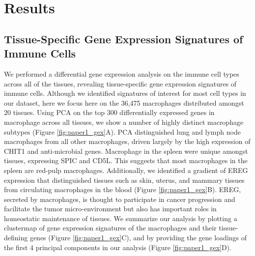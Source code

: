 \section{Results}

\subsection{Tissue-Specific Gene Expression Signatures of Immune Cells}

We performed a differential gene expression analysis on the immune cell types across all of the tissues, revealing tissue-specific gene expression signatures of immune cells. Although we identified signatures of interest for most cell types in our dataset, here we focus here on the 36,475 macrophages distributed amongst 20 tissues. Using PCA on the top 300 differentially expressed genes in macrophage across all tissues, we show a number of highly distinct macrophage subtypes (Figure \ref{fig:paper1_gex}A). PCA distinguished lung and lymph node macrophages from all other macrophages, driven largely by the high expression of CHIT1 and anti-microbial genes. Macrophage in the spleen were unique amongst tissues, expressing SPIC and CD5L. This suggests that most macrophages in the spleen are red-pulp macrophages. Additionally, we identified a gradient of EREG expression that distinguished tissues such as skin, uterus, and mammary tissues from circulating macrophages in the blood (Figure \ref{fig:paper1_gex}B). EREG, secreted by macrophages, is thought to participate in cancer progression and facilitate the tumor micro-environment but also has important roles in homeostatic maintenance of tissues. We summarize our analysis by plotting a clustermap of gene expression signatures of the macrophages and their tissue-defining genes (Figure \ref{fig:paper1_gex}C), and by providing the gene loadings of the first 4 principal components in our analysis (Figure \ref{fig:paper1_gex}D). 
